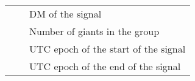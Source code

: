 \begin{table}[]
\begin{tabular}{lll}
																																																									&                                                            & DM of the signal                                                                                                     \\
																																																									&                                                            & Number of giants in the group                                                                                        \\
																																																									&                                                            & UTC epoch of the start of the signal                                                                                 \\
																																																									&                                                            & UTC epoch of the end of the signal                                                                                  
										 
 \end{tabular}
\end{table}
